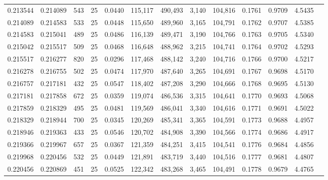 \begin{tabular}{rrrrrrrrrrrrr}
0.213544 & 0.214089 &   543 &  25 &                                     0.0440 & 115,117 & 490,493 &   3,140 & 104,816 & 0.1761 & 0.9709 & 4.5435 \\
0.214089 & 0.214583 &   533 &  25 &                                     0.0448 & 115,650 & 489,960 &   3,165 & 104,791 & 0.1762 & 0.9707 & 4.5385 \\
0.214583 & 0.215041 &   489 &  25 &                                     0.0486 & 116,139 & 489,471 &   3,190 & 104,766 & 0.1763 & 0.9705 & 4.5340 \\
0.215042 & 0.215517 &   509 &  25 &                                     0.0468 & 116,648 & 488,962 &   3,215 & 104,741 & 0.1764 & 0.9702 & 4.5293 \\
0.215517 & 0.216277 &   820 &  25 &                                     0.0296 & 117,468 & 488,142 &   3,240 & 104,716 & 0.1766 & 0.9700 & 4.5217 \\
0.216278 & 0.216755 &   502 &  25 &                                     0.0474 & 117,970 & 487,640 &   3,265 & 104,691 & 0.1767 & 0.9698 & 4.5170 \\
0.216757 & 0.217181 &   432 &  25 &                                     0.0547 & 118,402 & 487,208 &   3,290 & 104,666 & 0.1768 & 0.9695 & 4.5130 \\
0.217181 & 0.217858 &   672 &  25 &                                     0.0359 & 119,074 & 486,536 &   3,315 & 104,641 & 0.1770 & 0.9693 & 4.5068 \\
0.217859 & 0.218329 &   495 &  25 &                                     0.0481 & 119,569 & 486,041 &   3,340 & 104,616 & 0.1771 & 0.9691 & 4.5022 \\
0.218329 & 0.218944 &   700 &  25 &                                     0.0345 & 120,269 & 485,341 &   3,365 & 104,591 & 0.1773 & 0.9688 & 4.4957 \\
0.218946 & 0.219363 &   433 &  25 &                                     0.0546 & 120,702 & 484,908 &   3,390 & 104,566 & 0.1774 & 0.9686 & 4.4917 \\
0.219366 & 0.219967 &   657 &  25 &                                     0.0367 & 121,359 & 484,251 &   3,415 & 104,541 & 0.1776 & 0.9684 & 4.4856 \\
0.219968 & 0.220456 &   532 &  25 &                                     0.0449 & 121,891 & 483,719 &   3,440 & 104,516 & 0.1777 & 0.9681 & 4.4807 \\
0.220456 & 0.220869 &   451 &  25 &                                     0.0525 & 122,342 & 483,268 &   3,465 & 104,491 & 0.1778 & 0.9679 & 4.4765 \\

\end{tabular}
